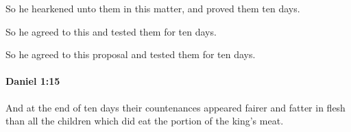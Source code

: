 			\begin{versebox}
					\item[BHS] 
					\item[LXX] 
					\item[ASV] So he hearkened unto them in this matter, and proved them ten days.
					\item[NIV] So he agreed to this and tested them for ten days.
					\item[NRSV] So he agreed to this proposal and tested them for ten days.
			\end{versebox}

		\paragraph{Daniel 1:15} %
			\label{DANIEL-1-15}

			And at the end of ten days their countenances appeared fairer and fatter in flesh than all the children which did eat the portion of the king’s meat.

